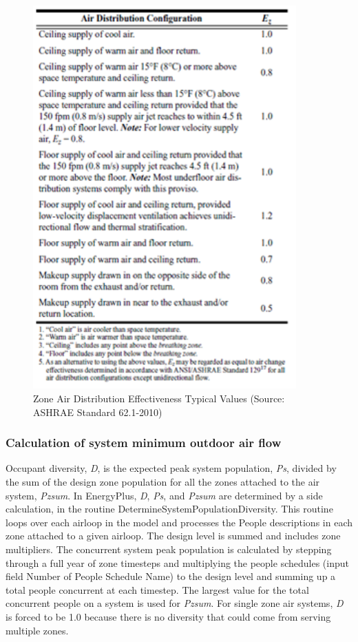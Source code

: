 \begin{figure}[hbtp] %
\centering
\includegraphics[width=0.9\textwidth, height=0.9\textheight, keepaspectratio=true]{media/image4716.png}
\caption{Zone Air Distribution Effectiveness Typical Values (Source: ASHRAE Standard 62.1-2010) \protect \label{fig:zone-air-distribution-effectiveness-typical}}
\end{figure}

\subsubsection{Calculation of system minimum outdoor air flow}\label{calculation-of-system-minimum-outdoor-air-flow}

Occupant diversity, \emph{D}, is the expected peak system population, \emph{Ps}, divided by the sum of the design zone population for all the zones attached to the air system, \emph{Pzsum}. In EnergyPlus, \emph{D}, \emph{Ps}, and \emph{Pzsum} are determined by a side calculation, in the routine DetermineSystemPopulationDiversity.  This routine loops over each airloop in the model and processes the People descriptions in each zone attached to a given airloop.  The design level is summed and includes zone multipliers.  The concurrent system peak population is calculated by stepping through a full year of zone timesteps and multiplying the people schedules (input field Number of People Schedule Name) to the design level and summing up a total people concurrent at each timestep.  The largest value for the total concurrent people on a system is used for \emph{Pzsum}.  For single zone air systems, \emph{D} is forced to be 1.0 because there is no diversity that could come from serving multiple zones.

